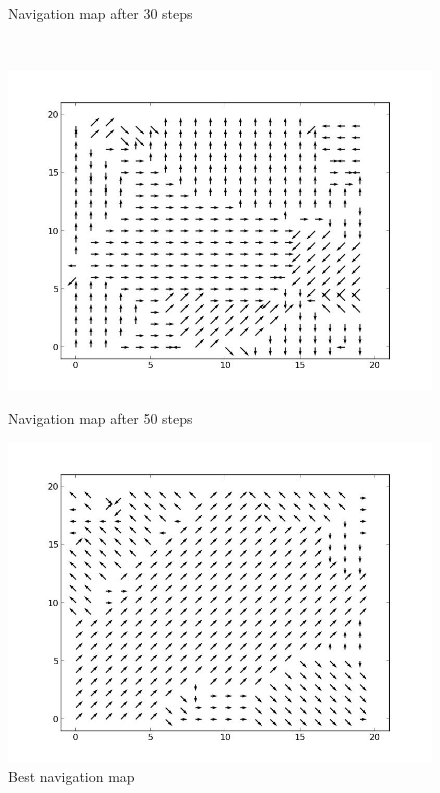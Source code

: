 \documentclass[a4paper, 12pt]{article}
\begin{document}
\begin{figure}
\begin{minipage}[c]{0.5\textwidth}
      \caption{Navigation map after 30 steps}
    \end{minipage}
    \\
  \centering
  \begin{minipage}[c]{0.5\textwidth}
    \centering
    \includegraphics[scale=0.3]{../figure/navMp50.jpeg}
  \caption{Navigation map after 50 steps}
  \end{minipage}%
  \begin{minipage}[c]{0.5\textwidth}
    \centering
    \includegraphics[scale=0.3]{../figure/navMap.jpeg}
  \caption{Best navigation map}
  \end{minipage}
\end{figure}
\end{document}
